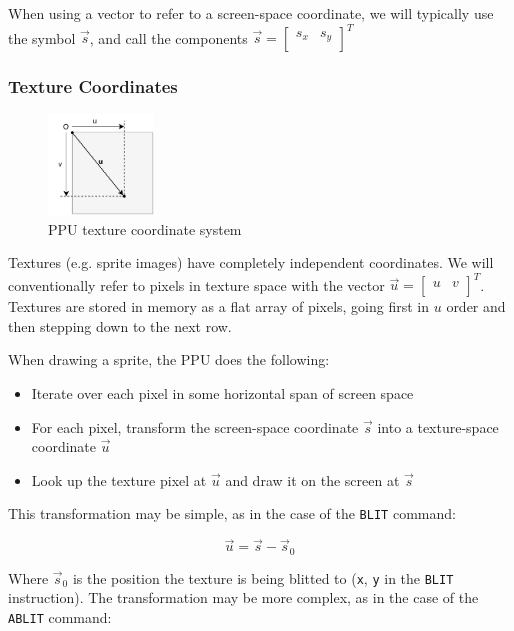 When using a vector to refer to a screen-space coordinate, we will typically use the symbol $\vec{s}$, and call the components $\vec{s} = \begin{bmatrix} s_x & s_y \\ \end{bmatrix}^T$

\subsubsection*{Texture Coordinates}

\begin{figure}[H]
\centering
\caption{PPU texture coordinate system}
\label{diagram:ppu_coord_texture}
\includegraphics[width=0.25\textwidth]{diagrams/ppu_coord_texture.pdf}
\end{figure}

Textures (e.g. sprite images) have completely independent coordinates. We will conventionally refer to pixels in texture space with the vector $\vec{u} = \begin{bmatrix} u & v \\ \end{bmatrix}^T$. Textures are stored in memory as a flat array of pixels, going first in $u$ order and then stepping down to the next row.

When drawing a sprite, the PPU does the following:

\begin{itemize}
	\item Iterate over each pixel in some horizontal span of screen space
	\item For each pixel, transform the screen-space coordinate $\vec{s}$ into a texture-space coordinate $\vec{u}$
	\item Look up the texture pixel at $\vec{u}$ and draw it on the screen at $\vec{s}$
\end{itemize}

This transformation may be simple, as in the case of the {\tt BLIT} command:

\[
\vec{u} = \vec{s} - \vec{s}_0
\]

Where $\vec{s}_0$ is the position the texture is being blitted to ({\tt x}, {\tt y} in the {\tt BLIT} instruction). The transformation may be more complex, as in the case of the {\tt ABLIT} command:

